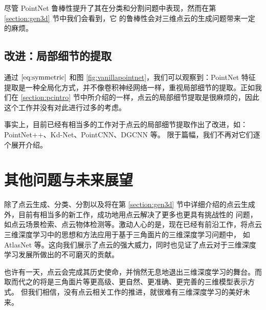 尽管 PointNet 鲁棒性提升了其在分类和分割问题中表现，然而在第 \ref{section:gen3d} 节中我们会看到，它 的鲁棒性会对三维点云的生成问题带来一定的麻烦。

\subsection{改进：局部细节的提取}
通过 $\eqref{eq:symmetric}$ 和图 \ref{fig:vanillapointnet}，我们可以观察到：PointNet 特征提取是一种全局化方式，并不像卷积神经网络一样，重视局部细节的提取。正如我们在 \ref{section:pcintro} 节中所介绍的一样，点云的局部细节提取是很麻烦的，因此这个工作并没有对此进行过多的考虑。

事实上，目前已经有相当多的工作对于点云的局部细节提取作出了改进，如：
PointNet++\cite{pointnet2}、Kd-Net\cite{kdnet}、PointCNN\cite{pointcnn}、DGCNN\cite{dgcnn} 等。
限于篇幅，我们不再对它们逐个展开介绍。

\section{其他问题与未来展望}
除了点云生成、分类、分割以及将在第  \ref{section:gen3d} 节中详细介绍的点云生成外，目前有相当多的新工作，成功地用点云解决了更多也更具有挑战性的%
问题，
如点云场景检索\cite{pointnetvlad}、点云物体检测\cite{frustumpointnet}等。激动人心的是，现在已经有前沿工作，将点云三维深度学习中的思想和方法应用于基于三角面片的三维深度学习问题中，
如 AtlasNet\cite{atlasnet} 等。这向我们展示了点云的强大威力，同时也见证了点云对于三维深度学习发展所做出的不可磨灭的贡献。

也许有一天，点云会完成其历史使命，并悄然无息地退出三维深度学习的舞台。而取而代之的将是三角面片等更高级、更自然、更准确、更完善的三维模型表示方式。
但我们相信，没有点云相关工作的推进，就很难有三维深度学习的美好未来。

